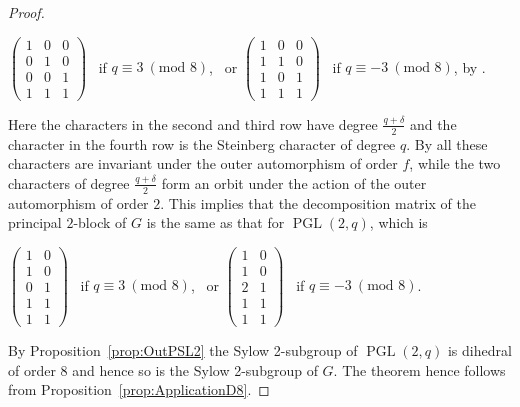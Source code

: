 \documentclass[11pt, a4paper]{amsart}
\theoremstyle{definition}
\theoremstyle{definition}
\newcommand{\PGL}{{\operatorname{PGL}}}
\begin{document}
\begin{proof}
\begin{center}
$\begin{pmatrix} 1 & 0 & 0 \\ 0 & 1 & 0 \\ 0 & 0 & 1 \\ 1 & 1 & 1  \end{pmatrix}$ \ if  $q \equiv 3\ (\textrm{mod } 8)$, \ or $\begin{pmatrix} 1 & 0 & 0 \\ 1 & 1 & 0 \\ 1 & 0 & 1 \\ 1 & 1 & 1 \end{pmatrix}$ \ if $q \equiv -3\ (\textrm{mod } 8)$, by \cite[VIII]{Burkhardt}.
\end{center}
Here the characters in the second and third row have degree $\frac{q+\delta}{2}$ and the character in the fourth row is the Steinberg character of degree $q$. By \cite[Lemmas 4.4, 4.5]{White} all these characters are invariant under the outer automorphism of order $f$, while the two characters of degree $\frac{q+\delta}{2}$ form an orbit under the action of the outer automorphism of order $2$. 
This implies that the decomposition matrix of the principal $2$-block of $G$ is the same as that for $\PGL(2,q)$, which is
\begin{center}
$\begin{pmatrix} 1 & 0 \\ 1 & 0 \\ 0 & 1 \\ 1 & 1 \\ 1 & 1  \end{pmatrix}$ \ if  $q \equiv 3 \ (\textrm{mod } 8)$, \ or $\begin{pmatrix} 1 & 0 \\ 1 & 0 \\ 2 & 1 \\ 1 & 1 \\ 1 & 1  \end{pmatrix}$ \ if $q \equiv -3 \ (\textrm{mod } 8)$.
\end{center}
By Proposition~\ref{prop:OutPSL2} the Sylow 2-subgroup of $\PGL(2,q)$ is dihedral of order $8$ and hence so is the Sylow 2-subgroup of $G$. The theorem hence follows from Proposition~\ref{prop:ApplicationD8}.
\end{proof}
\end{document}
